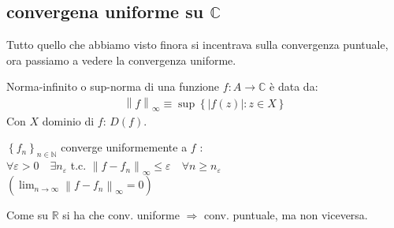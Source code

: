 \documentclass[a4paper, oneside]{article}
\begin{document}
    \subsection{convergena uniforme su $\mathbb{C}$}
    Tutto quello che abbiamo visto finora si incentrava sulla convergenza puntuale, ora passiamo a vedere la convergenza uniforme.
    \begin{definition}
        Norma-infinito o sup-norma di una funzione $f: A \to \mathbb{C}$ è data da:
        \begin{gather*}
            \left\lVert f \right\rVert _{\infty} \equiv \sup \left\{|f(z)| : z \in X\right\} 
        \end{gather*}
        Con $X$ dominio di $f$: $D(f)$.
    \end{definition}
    \begin{definition}
        $\left\{f_n\right\} _{n \in \mathbb{N}}$ converge uniformemente a $f$ :\\
        $\forall \varepsilon > 0 \quad \exists n_\varepsilon$ t.c.  $\left\lVert f-f_n \right\rVert_\infty \leq \varepsilon \quad \forall n \geq n_\varepsilon$ \\
        $\left(\lim_{n \to \infty} \left\lVert f-f_n \right\rVert_\infty = 0\right) $
    \end{definition}
    Come su $\mathbb{R}$ si ha che conv. uniforme $\Rightarrow$ conv. puntuale, ma non viceversa.\\
\end{document}
